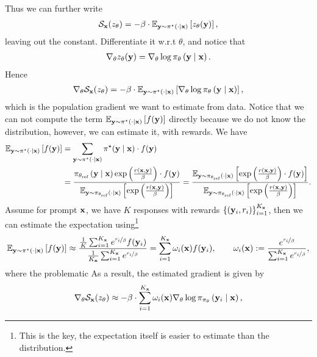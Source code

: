 \documentclass[11pt]{article}  %
\begin{document}
Thus we can further write 
\begin{align*}
  \mathcal{S}_{\mathbf{x}}(z_\theta) = - \beta \cdot \mathbb{E}_{\mathbf{y} \sim \pi^\star(\cdot \mid \mathbf{x})}\left[z_{\theta}(\mathbf{y})\right],
\end{align*}
leaving out the constant.
Differentiate it w.r.t $\theta$, and notice that 
\begin{align*}
  \nabla_\theta z_\theta(\mathbf{y}) = \nabla_\theta \log \pi_{\theta}\left( \mathbf{y} \mid \mathbf{x} \right). 
\end{align*}
Hence 
\begin{align*}
  \nabla_\theta \mathcal{S}_{\mathbf{x}}(z_\theta) = - \beta \cdot \mathbb{E}_{\mathbf{y} \sim \pi^\star(\cdot\mid \mathbf{x})}\left[\nabla_{\theta} \log \pi_{\theta}\left( \mathbf{y} \mid \mathbf{x} \right)\right],
\end{align*}
which is the population gradient we want to estimate from data.
Notice that we can not compute the term $\mathbb{E}_{\mathbf{y} \sim \pi^\star(\cdot \mid \mathbf{x})}\left[f(\mathbf{y})\right]$ directly because we do not know the distribution, however, we can estimate it, with rewards.
We have 
\begin{align*}
  \mathbb{E}_{\mathbf{y} \sim \pi^\star(\cdot \mid \mathbf{x})}\left[f(\mathbf{y})\right] &= \sum_{\mathbf{y} \sim \pi^\star(\cdot \mid \mathbf{x})} \pi^\star(\mathbf{y} \mid \mathbf{x}) \cdot f(\mathbf{y}) \\
  &= \frac{\pi_{\theta_{\text{ref}}}\left( \mathbf{y} \mid \mathbf{x} \right)\exp\left( \frac{r(\mathbf{x}, \mathbf{y})}{\beta} \right) \cdot f(\mathbf{y})}{\mathbb{E}_{\mathbf{y} \sim \pi_{\theta_{\text{ref}}}\left( \cdot \mid \mathbf{x} \right)}\left[\exp\left( \frac{r(\mathbf{x},\mathbf{y})}{\beta} \right)\right]} =  \frac{\mathbb{E}_{\mathbf{y} \sim \pi_{\theta_{\text{ref}}}\left( \cdot \mid \mathbf{x} \right)}\left[\exp\left( \frac{r(\mathbf{x}, \mathbf{y})}{\beta} \right) \cdot f(\mathbf{y})\right]}{\mathbb{E}_{\mathbf{y} \sim \pi_{\theta_{\text{ref}}}\left( \cdot \mid \mathbf{x} \right)}\left[\exp\left( \frac{r(\mathbf{x},\mathbf{y})}{\beta} \right)\right]}.
\end{align*}
Assume for prompt $\mathbf{x}$, we have $K$ responses with rewards $\left\{ \left( \mathbf{y}_i, r_i \right) \right\}_{i=1}^{K_{\mathbf{x}}}$, then we can estimate the expectation using\footnote{This is the key, the expectation itself is easier to estimate than the distribution.} 
\begin{align*}
  \mathbb{E}_{\mathbf{y} \sim \pi^\star(\cdot \mid \mathbf{x})}\left[f(\mathbf{y})\right] \approx \frac{\frac{1}{K}\sum_{i=1}^{{K_{\mathbf{x}}}}e^{\nicefrac{r_i}{\beta}} f(\mathbf{y}_i)}{\frac{1}{{K_{\mathbf{x}}}}\sum_{i=1}^{{K_{\mathbf{x}}}}e^{\nicefrac{r_i}{\beta}}} = \sum_{i=1}^{{K_{\mathbf{x}}}} \omega_i(\mathbf{x}) f(\mathbf{y}_i), \qquad \omega_i(\mathbf{x}) := \frac{e^{\nicefrac{r_i}{\beta}}}{\sum_{i=1}^{{K_{\mathbf{x}}}}e^{\nicefrac{r_i}{\beta}}},
\end{align*}
where the problematic 
As a result, the estimated gradient is given by 
\begin{align*}
  \nabla_\theta \mathcal{S}_{\mathbf{x}}(z_\theta) \approx -\beta\cdot\sum_{i=1}^{{K_{\mathbf{x}}}}\omega_i(\mathbf{x}) \nabla_\theta \log \pi_{\pi_\theta}\left( \mathbf{y}_i \mid \mathbf{x} \right),
\end{align*}
\end{document}
